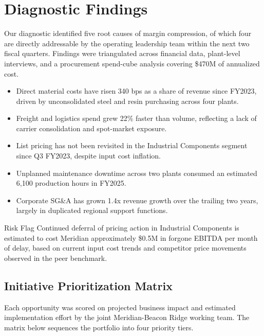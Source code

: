 \section{Diagnostic Findings}

Our diagnostic identified five root causes of margin compression, of which four are directly addressable by the operating leadership team within the next two fiscal quarters. Findings were triangulated across financial data, plant-level interviews, and a procurement spend-cube analysis covering \$470M of annualized cost.

\begin{itemize}
\item Direct material costs have risen 340 bps as a share of revenue since FY2023, driven by unconsolidated steel and resin purchasing across four plants.
\item Freight and logistics spend grew 22\% faster than volume, reflecting a lack of carrier consolidation and spot-market exposure.
\item List pricing has not been revisited in the Industrial Components segment since Q3 FY2023, despite input cost inflation.
\item Unplanned maintenance downtime across two plants consumed an estimated 6,100 production hours in FY2025.
\item Corporate SG\&A has grown 1.4x revenue growth over the trailing two years, largely in duplicated regional support functions.
\end{itemize}

\begin{calloutbox}[negred]{Risk Flag}
Continued deferral of pricing action in Industrial Components is estimated to cost Meridian approximately \$0.5M in forgone EBITDA per month of delay, based on current input cost trends and competitor price movements observed in the peer benchmark.
\end{calloutbox}

\subsection{Initiative Prioritization Matrix}

Each opportunity was scored on projected business impact and estimated implementation effort by the joint Meridian-Beacon Ridge working team. The matrix below sequences the portfolio into four priority tiers.

